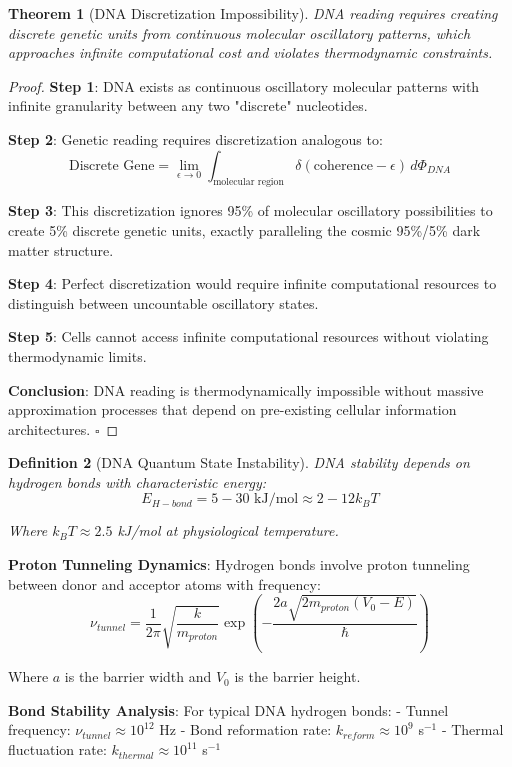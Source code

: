 \documentclass[12pt,a4paper]{article}
\newtheorem{theorem}{Theorem}[section]
\newtheorem{definition}[theorem]{Definition}
\begin{document}
\begin{theorem}[DNA Discretization Impossibility]
DNA reading requires creating discrete genetic units from continuous molecular oscillatory patterns, which approaches infinite computational cost and violates thermodynamic constraints.
\end{theorem}

\begin{proof}
\textbf{Step 1}: DNA exists as continuous oscillatory molecular patterns with infinite granularity between any two "discrete" nucleotides.

\textbf{Step 2}: Genetic reading requires discretization analogous to:
$$\text{Discrete Gene} = \lim_{\epsilon \to 0} \int_{\text{molecular region}} \delta(\text{coherence} - \epsilon) \, d\Phi_{DNA}$$

\textbf{Step 3}: This discretization ignores 95\% of molecular oscillatory possibilities to create 5\% discrete genetic units, exactly paralleling the cosmic 95\%/5\% dark matter structure.

\textbf{Step 4}: Perfect discretization would require infinite computational resources to distinguish between uncountable oscillatory states.

\textbf{Step 5}: Cells cannot access infinite computational resources without violating thermodynamic limits.

\textbf{Conclusion}: DNA reading is thermodynamically impossible without massive approximation processes that depend on pre-existing cellular information architectures. $\square$
\end{proof}

\begin{definition}[DNA Quantum State Instability]
DNA stability depends on hydrogen bonds with characteristic energy:
$$E_{H-bond} = 5-30 \text{ kJ/mol} \approx 2-12 k_BT$$

Where $k_BT \approx 2.5$ kJ/mol at physiological temperature.
\end{definition}

\textbf{Proton Tunneling Dynamics}: Hydrogen bonds involve proton tunneling between donor and acceptor atoms with frequency:
$$\nu_{tunnel} = \frac{1}{2\pi} \sqrt{\frac{k}{m_{proton}}} \exp\left(-\frac{2a\sqrt{2m_{proton}(V_0-E)}}{\hbar}\right)$$

Where $a$ is the barrier width and $V_0$ is the barrier height.

\textbf{Bond Stability Analysis}: For typical DNA hydrogen bonds:
- Tunnel frequency: $\nu_{tunnel} \approx 10^{12}$ Hz
- Bond reformation rate: $k_{reform} \approx 10^9$ s$^{-1}$
- Thermal fluctuation rate: $k_{thermal} \approx 10^{11}$ s$^{-1}$
\end{document}
